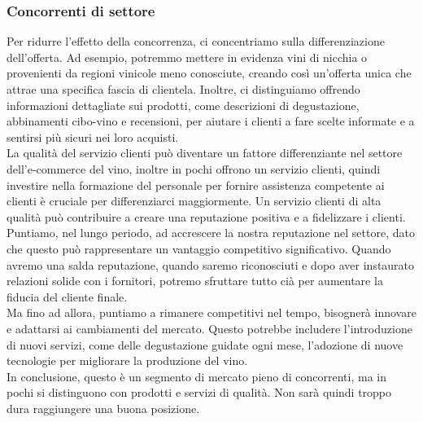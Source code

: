 \documentclass[12pt, a4paper]{article}
\newcommand{\meskip}{\medskip \\}
\newcommand{\bskip}{\bigskip \\}
\begin{document}
\subsubsection{Concorrenti di settore}
Per ridurre l'effetto della concorrenza, ci concentriamo sulla differenziazione dell'offerta. Ad esempio, potremmo mettere in evidenza vini di nicchia o provenienti da regioni vinicole meno conosciute, creando così un'offerta unica che attrae una specifica fascia di clientela. Inoltre, ci distinguiamo offrendo informazioni dettagliate sui prodotti, come descrizioni di degustazione, abbinamenti cibo-vino e recensioni, per aiutare i clienti a fare scelte informate e a sentirsi più sicuri nei loro acquisti.\meskip
La qualità del servizio clienti può diventare un fattore differenziante nel settore dell'e-commerce del vino, inoltre in pochi offrono un servizio clienti, quindi investire nella formazione del personale per fornire assistenza competente ai clienti è cruciale per differenziarci maggiormente. Un servizio clienti di alta qualità può contribuire a creare una reputazione positiva e a fidelizzare i clienti.\meskip
Puntiamo, nel lungo periodo, ad accrescere la nostra reputazione nel settore, dato che questo può rappresentare un vantaggio competitivo significativo. Quando avremo una salda reputazione, quando saremo riconosciuti e dopo aver instaurato relazioni solide con i fornitori, potremo sfruttare tutto cià per aumentare la fiducia del cliente finale.\\
Ma fino ad allora, puntiamo a rimanere competitivi nel tempo, bisognerà innovare e adattarsi ai cambiamenti del mercato. Questo potrebbe includere l'introduzione di nuovi servizi, come delle degustazione guidate ogni mese, l'adozione di nuove tecnologie per migliorare la produzione del vino.\bskip
In conclusione, questo è un segmento di mercato pieno di concorrenti, ma in pochi si distinguono con prodotti e servizi di qualità. Non sarà quindi troppo dura raggiungere una buona posizione.
\end{document}
